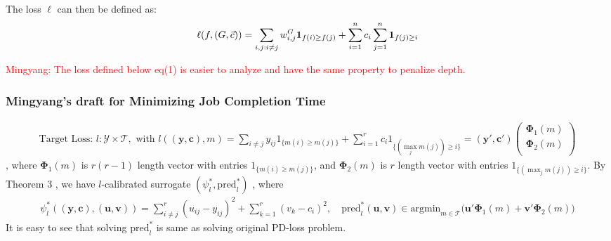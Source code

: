 The loss $\ell$ can then be defined as:
\begin{align*}
  \ell(f, (G, \vec{c}))
  = \sum_{i,j: i \neq j} w_{i,j}^G {\mathbf 1}_{f(i) \geq f(j)}
  + \sum_{i=1}^n c_i \sum_{j=1}^n {\mathbf 1}_{f(j) \geq i}
\end{align*}

\textcolor{red}{Mingyang: The loss defined below eq(1) is easier to analyze and have the same property to penalize depth.}


\subsubsection{Mingyang's draft for Minimizing Job Completion Time}


\begin{equation}\label{eq:pdloss}
\begin{split}
\text{Target Loss: }l: \mathcal{Y}\times\mathcal{T}, \text{ with } l((\mathbf{y},\mathbf{c}),  m)=\sum\limits_{i\not=j}y_{ij}1_{\{m(i)\geq m(j)\}}+\sum\limits_{i=1}^rc_i1_{\{(\max_jm(j))\geq i\}}=(\mathbf{y}', \mathbf{c}')\begin{pmatrix} \mathbf{\Phi}_1(m) \\\mathbf{\Phi}_2(m) \\\end{pmatrix} 
\end{split}
\end{equation}
, where $\mathbf{\Phi}_1(m)$ is $r(r-1)$ length vector with entries $1_{\{m(i)\geq m(j)\}}$, and  $\mathbf{\Phi}_2(m)$ is $r$ length vector with entries $1_{\{(\max_jm(j))\geq i\}}$.  By Theorem 3 \cite{Ramaswamy2013}, we have $l$-calibrated surrogate $(\psi_l^*, \text{pred}_l^*)$ , where
\begin{equation}
\begin{split}
\psi_l^*((\mathbf{y},\mathbf{c}), (\mathbf{u}, \mathbf{v}))=\sum\limits_{i\not=j}^{r}(u_{ij}-y_{ij})^2+\sum\limits_{k=1}^r(v_k-c_i)^2,\quad \text{pred}_l^*(\mathbf{u}, \mathbf{v})\in\text{argmin}_{m\in \mathcal{T}}\bigg(\mathbf{u}'\mathbf{\Phi}_1(m)+\mathbf{v}'\mathbf{\Phi}_2(m)\bigg)
\end{split}
\end{equation}
It is easy to see that solving $\text{pred}_l^*$ is same as solving original PD-loss problem. 



